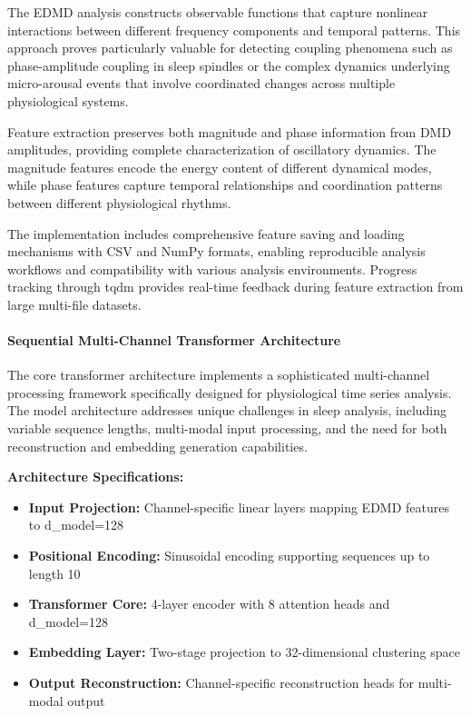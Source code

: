 \documentclass[a4paper,12pt,twoside]{article}
\begin{document}
The EDMD analysis constructs observable functions that capture nonlinear interactions between different frequency components and temporal patterns. This approach proves particularly valuable for detecting coupling phenomena such as phase-amplitude coupling in sleep spindles or the complex dynamics underlying micro-arousal events that involve coordinated changes across multiple physiological systems.

Feature extraction preserves both magnitude and phase information from DMD amplitudes, providing complete characterization of oscillatory dynamics. The magnitude features encode the energy content of different dynamical modes, while phase features capture temporal relationships and coordination patterns between different physiological rhythms.

The implementation includes comprehensive feature saving and loading mechanisms with CSV and NumPy formats, enabling reproducible analysis workflows and compatibility with various analysis environments. Progress tracking through tqdm provides real-time feedback during feature extraction from large multi-file datasets.

\paragraph{Sequential Multi-Channel Transformer Architecture}

The core transformer architecture implements a sophisticated multi-channel processing framework specifically designed for physiological time series analysis. The model architecture addresses unique challenges in sleep analysis, including variable sequence lengths, multi-modal input processing, and the need for both reconstruction and embedding generation capabilities.

\textbf{Architecture Specifications:}
\begin{itemize}
    \item \textbf{Input Projection:} Channel-specific linear layers mapping EDMD features to d\_model=128
    \item \textbf{Positional Encoding:} Sinusoidal encoding supporting sequences up to length 10
    \item \textbf{Transformer Core:} 4-layer encoder with 8 attention heads and d\_model=128
    \item \textbf{Embedding Layer:} Two-stage projection to 32-dimensional clustering space
    \item \textbf{Output Reconstruction:} Channel-specific reconstruction heads for multi-modal output
\end{itemize}
\end{document}
